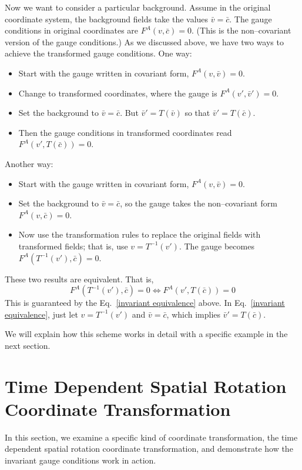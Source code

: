 \documentclass[letterpaper,nofootinbib,prd,amsmath,onecolumn]{revtex4-1}
\begin{document}
Now we want to consider a particular background. Assume in the original coordinate system, the background fields take the values $\bar v = \bar c$. The gauge 
conditions in original coordinates are $F^A(v,\bar c) = 0$. (This is the non--covariant version of the gauge conditions.) As we discussed above, we have two ways to achieve the transformed gauge conditions. One way: 
\begin{itemize}
	\item Start with the gauge written in covariant form, $F^A(v,\bar v) = 0$.
	\item Change to transformed coordinates, where the gauge is $F^A(v',\bar v') = 0$.
	\item Set the background to $\bar v = \bar c$. But $\bar v' = T(\bar v)$ so that $\bar v' = T(\bar c)$. 
	\item Then the gauge conditions in transformed coordinates read $F^A(v',T(\bar c)) = 0$. 
\end{itemize}
Another way: 
\begin{itemize}
	\item Start with the gauge written in covariant form, $F^A(v,\bar v) = 0$.
	\item Set the background to $\bar v = \bar c$, so the gauge takes the non--covariant form $F^A(v,\bar c) = 0$. 
	\item Now use the transformation rules to replace the original fields with transformed fields; that is, use $v = T^{-1}(v')$. 
	The gauge becomes $F^A(T^{-1}(v'),\bar c) = 0$. 
\end{itemize}
These two results are equivalent. That is, 
\begin{equation}
	F^A(T^{-1}(v'),\bar c) = 0 \Longleftrightarrow F^A(v',T(\bar c)) = 0
\end{equation}
This is guaranteed by the Eq.~\ref{invariant equivalence} above. In Eq.~\ref{invariant equivalence}, just let $v = T^{-1}(v')$ and $\bar v = \bar c$, which implies $\bar v' = T(\bar c)$.
 
We will explain how this scheme works in detail with a specific example in the next section. 

\section{Time Dependent Spatial Rotation Coordinate Transformation}\label{example}
In this section, we examine a specific kind of coordinate transformation, the time dependent spatial rotation coordinate transformation, and demonstrate how the invariant gauge conditions work in action. 
\end{document}
